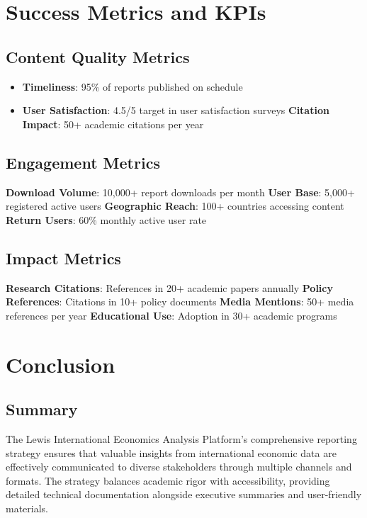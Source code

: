 \documentclass[11pt,a4paper]{article}
\begin{document}
\section{Success Metrics and KPIs}

\subsection{Content Quality Metrics}
\begin{itemize}
    \textbf{Accuracy Rate}: 99.5\% target for data and analysis
    \item \textbf{Timeliness}: 95\% of reports published on schedule
    \item \textbf{User Satisfaction}: 4.5/5 target in user satisfaction surveys
    \textbf{Citation Impact}: 50+ academic citations per year
\end{itemize}

\subsection{Engagement Metrics}
\begin{itemize}
    \textbf{Download Volume}: 10,000+ report downloads per month
    \textbf{User Base}: 5,000+ registered active users
    \textbf{Geographic Reach}: 100+ countries accessing content
    \textbf{Return Users}: 60\% monthly active user rate
\end{itemize}

\subsection{Impact Metrics}
\begin{itemize}
    \textbf{Research Citations}: References in 20+ academic papers annually
    \textbf{Policy References}: Citations in 10+ policy documents
    \textbf{Media Mentions}: 50+ media references per year
    \textbf{Educational Use}: Adoption in 30+ academic programs
\end{itemize}

\section{Conclusion}

\subsection{Summary}
The Lewis International Economics Analysis Platform's comprehensive reporting strategy ensures that valuable insights from international economic data are effectively communicated to diverse stakeholders through multiple channels and formats. The strategy balances academic rigor with accessibility, providing detailed technical documentation alongside executive summaries and user-friendly materials.
\end{document}
